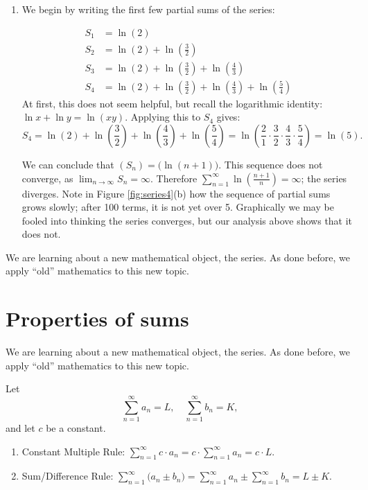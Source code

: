 \documentclass{ximera}
\begin{document}
\begin{example}
\begin{enumerate}
\item We begin by writing the first few partial sums of the series:

\begin{align*}
S_1 &= \ln\left(2\right) \\
S_2 &= \ln\left(2\right)+\ln\left(\frac32\right) \\
S_3 &= \ln\left(2\right)+\ln\left(\frac32\right)+\ln\left(\frac43\right) \\
S_4 &= \ln\left(2\right)+\ln\left(\frac32\right)+\ln\left(\frac43\right)+\ln\left(\frac54\right) 
\end{align*}
At first, this does not seem helpful, but recall the logarithmic identity: $\ln x+\ln y = \ln (xy).$ Applying this to $S_4$ gives:
$$S_4 = \ln\left(2\right)+\ln\left(\frac32\right)+\ln\left(\frac43\right)+\ln\left(\frac54\right) = \ln\left(\frac21\cdot\frac32\cdot\frac43\cdot\frac54\right) = \ln\left(5\right).$$

We can conclude that $(S_n) = \big(\ln (n+1)\big)$. This sequence does
not converge, as $\lim_{n\to\infty}S_n=\infty$. Therefore
$\sum_{n=1}^\infty \ln\left(\frac{n+1}{n}\right)=\infty$; the series
diverges. Note in Figure \ref{fig:series4}(b) how the sequence of
partial sums grows slowly; after 100 terms, it is not yet over
5. Graphically we may be fooled into thinking the series converges,
but our analysis above shows that it does not.
\end{enumerate}
\end{example}

We are learning about a new mathematical object, the series. As done
before, we apply ``old'' mathematics to this new topic.



\section{Properties of sums}

We are learning about a new mathematical object, the series. As done
before, we apply ``old'' mathematics to this new topic.

\begin{theorem}
  Let
  \[
  \sum_{n=1}^\infty a_n = L,\quad \sum_{n=1}^\infty b_n =K, 
  \]
  and let $c$ be a constant.
\begin{enumerate}
\item Constant Multiple Rule: $\sum_{n=1}^\infty c\cdot a_n =
  c\cdot\sum_{n=1}^\infty a_n = c\cdot L.$
\item Sum/Difference Rule: $\sum_{n=1}^\infty \big(a_n\pm b_n\big) =
  \sum_{n=1}^\infty a_n \pm \sum_{n=1}^\infty b_n = L \pm K.$
\end{enumerate} 
\end{theorem}
\end{document}
